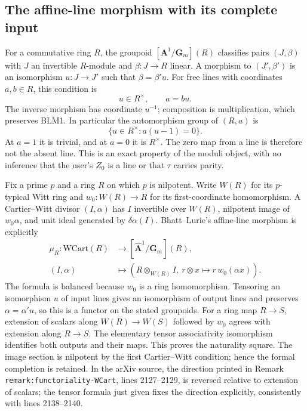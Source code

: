 \subsection{The affine-line morphism with its complete input}
For a commutative ring $R$, the groupoid
$[\mathbf A^1/\mathbf G_m](R)$ classifies pairs $(J,\beta)$ with
$J$ an invertible $R$-module and $\beta:J\to R$ linear.
A morphism to $(J',\beta')$ is an isomorphism $u:J\to J'$
such that $\beta=\beta'u$. For free lines with coordinates
$a,b\in R$, this condition is
\begin{equation}\tag{BLM1}
u\in R^\times,\qquad a=bu.
\end{equation}
The inverse morphism has coordinate $u^{-1}$; composition is
multiplication, which preserves BLM1. In particular the
automorphism group of $(R,a)$ is
\begin{equation}\tag{BLM2}
\{u\in R^\times:a(u-1)=0\}.
\end{equation}
At $a=1$ it is trivial, and at $a=0$ it is $R^\times$.
The zero map from a line is therefore not the absent line.
This is an exact property of the moduli object, with no inference
that the user's $Z_0$ is a line or that $\tau$ carries parity.

Fix a prime $p$ and a ring $R$ on which $p$ is nilpotent.
Write $W(R)$ for its $p$-typical Witt ring and $w_0:W(R)\to R$
for its first-coordinate homomorphism. A Cartier--Witt divisor
$(I,\alpha)$ has $I$ invertible over $W(R)$, nilpotent image of
$w_0\alpha$, and unit ideal generated by $\delta\alpha(I)$.
Bhatt--Lurie's affine-line morphism is explicitly
\begin{equation}\tag{BLM3}
\begin{split}
\mu_R:\mathrm{WCart}(R)&\longrightarrow
 [\widehat{\mathbf A}^1/\mathbf G_m](R),\\
(I,\alpha)&\longmapsto
\left(R\otimes_{W(R)}I,\ r\otimes x\mapsto r\,w_0(\alpha x)\right).
\end{split}
\end{equation}
The formula is balanced because $w_0$ is a ring homomorphism.
Tensoring an isomorphism $u$ of input lines gives an isomorphism
of output lines and preserves $\alpha=\alpha'u$, so this is a
functor on the stated groupoids. For a ring map $R\to S$, extension
of scalars along $W(R)\to W(S)$ followed by $w_0$ agrees with
extension along $R\to S$. The elementary tensor associativity
isomorphism identifies both outputs and their maps. This proves
the naturality square. The image section is nilpotent by the first
Cartier--Witt condition; hence the formal completion is retained.
In the arXiv source, the direction printed in Remark
\texttt{remark:\allowbreak{}functoriality-\allowbreak{}WCart}, lines 2127--2129, is reversed
relative to extension of scalars; the tensor formula just given
fixes the direction explicitly, consistently with lines 2138--2140.

